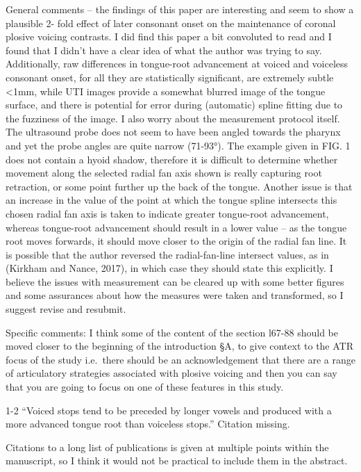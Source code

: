 \documentclass[]{article}
\begin{document}
General comments -- the findings of this paper are interesting and seem
to show a plausible 2- fold effect of later consonant onset on the
maintenance of coronal plosive voicing contrasts. I did find this paper
a bit convoluted to read and I found that I didn't have a clear idea of
what the author was trying to say. Additionally, raw differences in
tongue-root advancement at voiced and voiceless consonant onset, for all
they are statistically significant, are extremely subtle \textless{}1mm,
while UTI images provide a somewhat blurred image of the tongue surface,
and there is potential for error during (automatic) spline fitting due
to the fuzziness of the image. I also worry about the measurement
protocol itself. The ultrasound probe does not seem to have been angled
towards the pharynx and yet the probe angles are quite narrow (71-93°).
The example given in FIG. 1 does not contain a hyoid shadow, therefore
it is difficult to determine whether movement along the selected radial
fan axis shown is really capturing root retraction, or some point
further up the back of the tongue. Another issue is that an increase in
the value of the point at which the tongue spline intersects this chosen
radial fan axis is taken to indicate greater tongue-root advancement,
whereas tongue-root advancement should result in a lower value -- as the
tongue root moves forwards, it should move closer to the origin of the
radial fan line. It is possible that the author reversed the
radial-fan-line intersect values, as in (Kirkham and Nance, 2017), in
which case they should state this explicitly. I believe the issues with
measurement can be cleared up with some better figures and some
assurances about how the measures were taken and transformed, so I
suggest revise and resubmit.

Specific comments: I think some of the content of the section l67-88
should be moved closer to the beginning of the introduction §A, to give
context to the ATR focus of the study i.e.~there should be an
acknowledgement that there are a range of articulatory strategies
associated with plosive voicing and then you can say that you are going
to focus on one of these features in this study.

1-2 ``Voiced stops tend to be preceded by longer vowels and produced
with a more advanced tongue root than voiceless stops.'' Citation
missing.

\color{plum}

Citations to a long list of publications is given at multiple points
within the manuscript, so I think it would not be practical to include
them in the abstract. \color{black}
\end{document}
